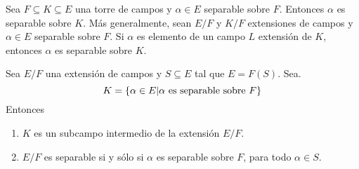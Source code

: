 \documentclass[12pt]{report}
\theoremstyle{largebreak}
\begin{document}
    \begin{obs}
        Sea $F\subseteq K \subseteq E$ una torre de campos y $\alpha\in E$ separable sobre $F$. Entonces $\alpha$ es separable sobre $K$. Más generalmente, sean $E/F$ y $K/F$ extensiones de campos y $\alpha\in E$ separable sobre $F$. Si $\alpha$ es elemento de un campo $L$ extensión de $K$, entonces $\alpha$ es separable sobre $K$.
    \end{obs}

    \begin{propo}
        Sea $E/F$ una extensión de campos y $S\subseteq E$ tal que $E=F(S)$. Sea.
        \begin{equation}
            K = \left\{\alpha\in E | \alpha \textup{ es separable sobre }F\right\}\label{equation:k_sep_cer}
        \end{equation}
        Entonces
        \begin{enumerate}
            \item $K$ es un subcampo intermedio de la extensión $E/F$.
            \item $E/F$ es separable si y sólo si $\alpha$ es separable sobre $F$, para todo $\alpha\in S$.
        \end{enumerate}
    \end{propo}
\end{document}
